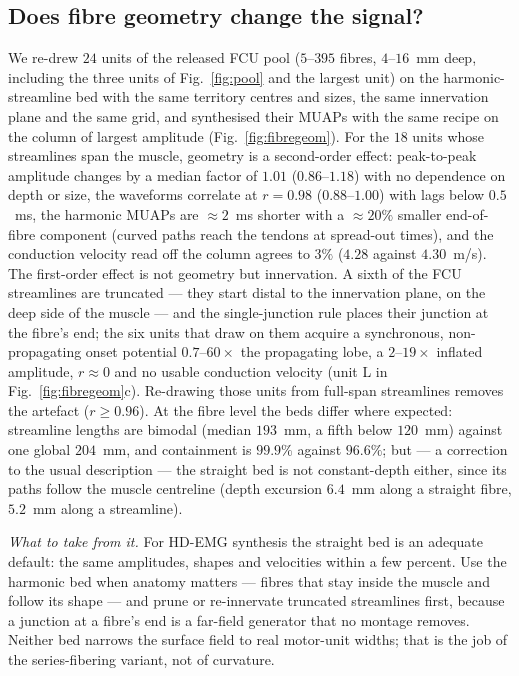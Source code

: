 \documentclass[11pt,a4paper]{article}
\begin{document}
\subsection{Does fibre geometry change the signal?}
\label{sec:study-fibres}
We re-drew $24$ units of the released FCU pool ($5$--$395$ fibres, $4$--$16$~mm deep,
including the three units of Fig.~\ref{fig:pool} and the largest unit) on the
harmonic-streamline bed with the same territory centres and sizes, the same innervation
plane and the same grid, and synthesised their MUAPs with the same recipe on the column of
largest amplitude (Fig.~\ref{fig:fibregeom}). For the $18$ units whose streamlines span
the muscle, geometry is a second-order effect: peak-to-peak amplitude changes by a median
factor of $1.01$ ($0.86$--$1.18$) with no dependence on depth or size, the waveforms
correlate at $r = 0.98$ ($0.88$--$1.00$) with lags below $0.5$~ms, the harmonic MUAPs
are $\approx2$~ms shorter with a $\approx20\%$ smaller end-of-fibre component (curved
paths reach the tendons at spread-out times), and the conduction velocity read off the
column agrees to $3\%$ ($4.28$ against $4.30$~m/s). The first-order effect is not
geometry but innervation. A sixth of the FCU streamlines are truncated --- they start
distal to the innervation plane, on the deep side of the muscle --- and the
single-junction rule places their junction at the fibre's end; the six units that draw on
them acquire a synchronous, non-propagating onset potential $0.7$--$60\times$ the
propagating lobe, a $2$--$19\times$ inflated amplitude, $r\approx0$ and no usable
conduction velocity (unit L in Fig.~\ref{fig:fibregeom}c). Re-drawing those units from
full-span streamlines removes the artefact ($r \geq 0.96$). At the fibre level the beds
differ where expected: streamline lengths are bimodal (median $193$~mm, a fifth below
$120$~mm) against one global $204$~mm, and containment is $99.9\%$ against $96.6\%$;
but --- a correction to the usual description --- the straight bed is not constant-depth
either, since its paths follow the muscle centreline (depth excursion $6.4$~mm along a
straight fibre, $5.2$~mm along a streamline).

\emph{What to take from it.} For HD-EMG synthesis the straight bed is an adequate
default: the same amplitudes, shapes and velocities within a few percent. Use the
harmonic bed when anatomy matters --- fibres that stay inside the muscle and follow its
shape --- and prune or re-innervate truncated streamlines first, because a junction at a
fibre's end is a far-field generator that no montage removes. Neither bed narrows the
surface field to real motor-unit widths; that is the job of the series-fibering variant,
not of curvature.
\end{document}
